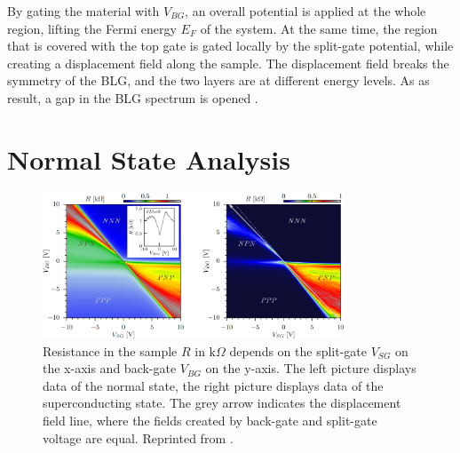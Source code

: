 By gating the material with $V_{BG}$, an overall potential is applied at the whole region, lifting the Fermi energy $E_F$ of the system. At the same time, the region that is covered with the top gate is gated locally by the split-gate potential, while creating a displacement field along the sample. The displacement field breaks the symmetry of the BLG, and the two layers are at different energy levels. As as result, a gap in the BLG spectrum is opened \cite{McCann2006}. 

\section{Normal State Analysis}\label{sec:exp-normal-state}
\begin{figure}
\centering
\includegraphics[width=0.8\textwidth]{figure/experiment/resistance-map-edit}
\caption{Resistance in the sample $R$ in $\text{k}\Omega$ depends on the split-gate $V_{SG}$ on the x-axis and back-gate $V_{BG}$ on the y-axis. The left picture displays data of the normal state, the right picture displays data of the superconducting state. The grey arrow indicates the displacement field line, where the fields created by back-gate and split-gate voltage are equal. Reprinted from \cite{Kraft2017}.}\label{fig:gate-map}
\end{figure}
